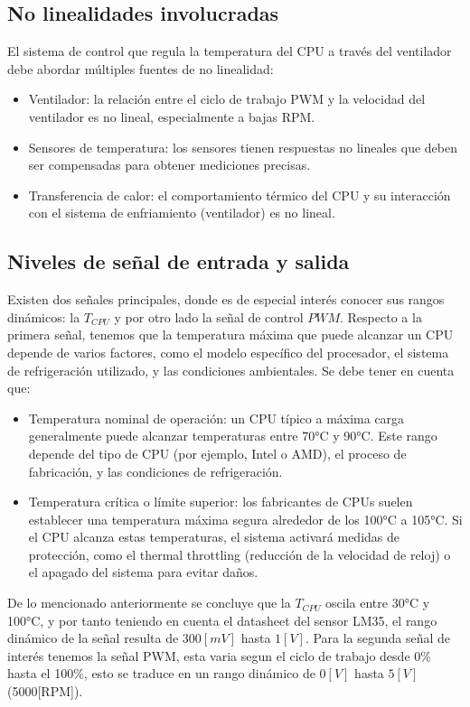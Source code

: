 \documentclass[12pt]{article}
\begin{document}
	\subsection{No linealidades involucradas}
	El sistema de control que regula la temperatura del CPU a través del ventilador debe abordar múltiples fuentes de no linealidad:
	
	\begin{itemize}
		\item Ventilador: la relación entre el ciclo de trabajo PWM y la velocidad del ventilador es no lineal, especialmente a bajas RPM.
		\item Sensores de temperatura: los sensores tienen respuestas no lineales que deben ser compensadas para obtener mediciones precisas.
		\item Transferencia de calor: el comportamiento térmico del CPU y su interacción con el sistema de enfriamiento (ventilador) es no lineal.
	\end{itemize}
	
	\subsection{Niveles de señal de entrada y salida}
	Existen dos señales principales, donde es de especial interés conocer sus rangos dinámicos: la  $T_{CPU}$ y por otro lado la señal de control $PWM$. Respecto a la primera señal, tenemos que la temperatura máxima que puede alcanzar un CPU depende de varios factores, como el modelo específico del procesador, el sistema de refrigeración utilizado, y las condiciones ambientales. Se debe tener en cuenta que:
	
	\begin{itemize}
		\item Temperatura nominal de operación: un CPU típico a máxima carga generalmente puede alcanzar temperaturas entre 70°C y 90°C. Este rango depende del tipo de CPU (por ejemplo, Intel o AMD), el proceso de fabricación, y las condiciones de refrigeración.
		\item Temperatura crítica o límite superior: los fabricantes de CPUs suelen establecer una temperatura máxima segura alrededor de los 100°C a 105°C. Si el CPU alcanza estas temperaturas, el sistema activará medidas de protección, como el thermal throttling (reducción de la velocidad de reloj) o el apagado del sistema para evitar daños.
	\end{itemize}
	
	De lo mencionado anteriormente se concluye que la $T_{CPU}$ oscila entre 30°C  y 100°C, y por tanto teniendo en cuenta el datasheet del sensor LM35, el rango dinámico de la señal resulta de $300[mV]$ hasta $1[V]$.
	Para la segunda señal de interés tenemos la señal PWM, esta varia segun el ciclo de trabajo desde 0\% hasta el 100\%, esto se traduce en un rango dinámico de $0[V]$ hasta $5[V]$(5000[RPM]).
\end{document}
